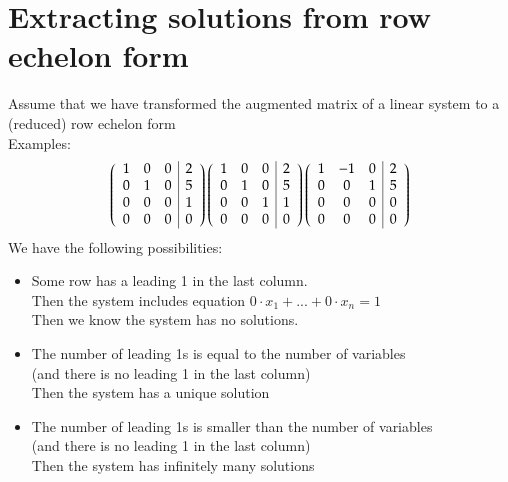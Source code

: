 \documentclass{article}[18pt]
\begin{document}
\section{Extracting solutions from row echelon form}
Assume that we have transformed the augmented matrix of a linear system to a (reduced) row echelon form\\
Examples:
$$\left( \begin{array} { l l l | l } { 1 } & { 0 } & { 0 } & { 2 } \\ { 0 } & { 1 } & { 0 } & { 5 } \\ { 0 } & { 0 } & { 0 } & { 1 } \\ { 0 } & { 0 } & { 0 } & { 0 } \end{array} \right) \left( \begin{array} { l l l | l } { 1 } & { 0 } & { 0 } & { 2 } \\ { 0 } & { 1 } & { 0 } & { 5 } \\ { 0 } & { 0 } & { 1 } & { 1 } \\ { 0 } & { 0 } & { 0 } & { 0 } \end{array} \right) \left( \begin{array} { c c c | c } { 1 } & { - 1 } & { 0 } & { 2 } \\ { 0 } & { 0 } & { 1 } & { 5 } \\ { 0 } & { 0 } & { 0 } & { 0 } \\ { 0 } & { 0 } & { 0 } & { 0 } \end{array} \right)$$
We have the following possibilities:
\begin{itemize}
\item Some row has a leading 1 in the last column.\\
Then the system includes equation $0\cdot x_1 +...+0\cdot x_n=1$\\
Then we know the system has no solutions.
\item The number of leading 1s is equal to the number of variables\\
(and there is no leading 1 in the last column)\\
Then the system has a unique solution
\item The number of leading 1s is smaller than the number of variables\\
(and there is no leading 1 in the last column)\\
Then the system has infinitely many solutions
\end{itemize}
\end{document}

